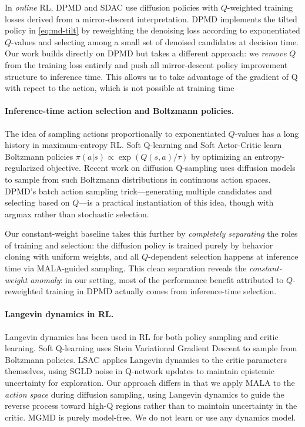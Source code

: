 \documentclass{article}
\theoremstyle{plain}
\theoremstyle{definition}
\theoremstyle{remark}
\begin{document}
In \emph{online} RL, DPMD and SDAC \citep{ma2025soft} use diffusion policies with $Q$-weighted training losses derived from a mirror-descent interpretation.
DPMD implements the tilted policy in \cref{eq:md-tilt} by reweighting the denoising loss according to exponentiated $Q$-values and selecting among a small set of denoised candidates at decision time.
Our work builds directly on DPMD but takes a different approach: we \emph{remove} $Q$ from the training loss entirely and push all mirror-descent policy improvement structure to inference time. This allows us to take advantage of the gradient of Q with repect to the action, which is not possible at training time

\paragraph{Inference-time action selection and Boltzmann policies.}
The idea of sampling actions proportionally to exponentiated $Q$-values has a long history in maximum-entropy RL.
Soft Q-learning \citep{haarnoja2017sql} and Soft Actor-Critic \citep{haarnoja2018sac} learn Boltzmann policies $\pi(a|s) \propto \exp(Q(s,a)/\tau)$ by optimizing an entropy-regularized objective.
Recent work on diffusion Q-sampling \citep{lu2024diffusionql} uses diffusion models to sample from such Boltzmann distributions in continuous action spaces.
DPMD's batch action sampling trick---generating multiple candidates and selecting based on $Q$---is a practical instantiation of this idea, though with argmax rather than stochastic selection.

Our constant-weight baseline takes this further by \emph{completely separating} the roles of training and selection: the diffusion policy is trained purely by behavior cloning with uniform weights, and all $Q$-dependent selection happens at inference time via MALA-guided sampling.
This clean separation reveals the \emph{constant-weight anomaly}: in our setting, most of the performance benefit attributed to $Q$-reweighted training in DPMD actually comes from inference-time selection.

\paragraph{Langevin dynamics in RL.}
Langevin dynamics has been used in RL for both policy sampling and critic learning.
Soft Q-learning \citep{haarnoja2017sql} uses Stein Variational Gradient Descent to sample from Boltzmann policies.
LSAC \citep{lsac2025} applies Langevin dynamics to the critic parameters themselves, using SGLD noise in Q-network updates to maintain epistemic uncertainty for exploration.
Our approach differs in that we apply MALA to the \emph{action space} during diffusion sampling, using Langevin dynamics to guide the reverse process toward high-Q regions rather than to maintain uncertainty in the critic.
MGMD is purely model-free. We do not learn or use any dynamics model.
\end{document}
